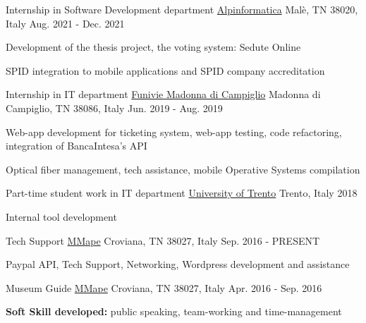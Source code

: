 \begin{cventries}
  \cventry
    {Internship in Software Development department} %
    {\href{https://www.alpinformatica.com/}{Alpinformatica}} %
    {Malè, TN 38020, Italy} %
    {Aug. 2021 - Dec. 2021} %
    {
      \begin{cvitems} %
        \item {Development of the thesis project, the voting system: Sedute Online}
        \item {SPID integration to mobile applications and SPID company accreditation}
      \end{cvitems}
    }
\cventry
{Internship in IT department} %
{\href{https://www.funiviecampiglio.it}{Funivie Madonna di Campiglio}} %
{Madonna di Campiglio, TN 38086, Italy} %
{Jun. 2019 - Aug. 2019} %
{
  \begin{cvitems} %
    \item {Web-app development for ticketing system, web-app testing, code refactoring, integration of BancaIntesa's API}
    \item {Optical fiber management, tech assistance, mobile Operative Systems compilation}
  \end{cvitems}
  }

  \cventry
{Part-time student work in IT department} %
{\href{https://www.unitn.it}{University of Trento}} %
{Trento, Italy} %
{2018} %
{
  \begin{cvitems} %
    \item {Internal tool development}
  \end{cvitems}
  }

\cventry
{Tech Support} %
{\href{https://www.mmape.it}{MMape}} %
{Croviana, TN 38027, Italy} %
{Sep. 2016 - PRESENT} %
{
  \begin{cvitems} %
    \item {Paypal API, Tech Support, Networking, Wordpress development and assistance}
  \end{cvitems}
}

\cventry
{Museum Guide} %
{\href{https://www.mmape.it}{MMape}} %
{Croviana, TN 38027, Italy} %
{Apr. 2016 - Sep. 2016} %
{
  \begin{cvitems} %
    \item {\textbf{Soft Skill developed:} public speaking, team-working and time-management}
  \end{cvitems}
}


\end{cventries}
